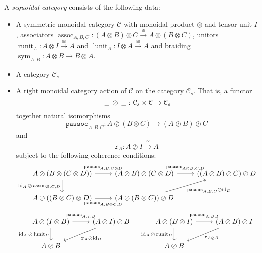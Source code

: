 \documentclass[a4paper,UKenglish]{lipics-v2016}
\theoremstyle{plain}
\theoremstyle{definition}
\newcommand*\from{\colon}
\DeclareMathOperator{\id}{id}
\newcommand{\tensor}{\otimes}
\newcommand{\sequoid}{\oslash}
\newcommand{\C}{\mathcal C}
\DeclareMathOperator{\assoc}{assoc}
\DeclareMathOperator{\lunit}{lunit}
\DeclareMathOperator{\runit}{runit}
\DeclareMathOperator{\sym}{sym}
\newcommand{\blank}{\;\underline{\hspace{1.5ex}}\;}
\newcommand{\toisom}{{\xrightarrow{\cong}}}
\newcommand{\passoc}{{\mathtt{passoc}}}
\newcommand{\run}{{\mathtt{r}}}
\newlength{\arrow}
\begin{document}
\begin{definition}
  A \emph{sequoidal category} consists of the following data:
  \begin{itemize}
    \item A symmetric monoidal category $\C$ with monoidal product $\tensor$ and tensor unit $I$, associators $\assoc_{A,B,C}\from(A\tensor B)\tensor C\toisom A\tensor(B\tensor C)$, unitors $\runit_A\from A\tensor I\toisom A$ and $\lunit_A\from I\tensor A\toisom A$ and braiding $\sym_{A,B}\from A\tensor B\to B\tensor A$.
    \item A category $\C_s$
    \item A right monoidal category action of $\C$ on the category $\C_s$.  That is, a functor
      \[
        \blank\sequoid\blank\from\C_s\times\C\to\C_s
        \]
      together natural isomorphisms
      \[
        \passoc_{A,B,C}\from A\sequoid(B\tensor C)\to (A\sequoid B)\sequoid C
        \]
      and
      \[
        \run_A\from A\sequoid I\toisom A
        \]
      subject to the following coherence conditions:
      \begin{equation*}
        \begin{tikzcd}
          A\sequoid(B\tensor(C\tensor D)) \arrow[r, "\passoc_{A,B,C\tensor D}" yshift=0.3em] \arrow[d, "\id_A\sequoid \assoc_{B,C,D}"']
            & (A \sequoid B) \sequoid (C\tensor D) \arrow[r, "\passoc_{A\sequoid B,C,D}" yshift=0.3em]
              & ((A\sequoid B)\sequoid C) \sequoid D \\
          A\sequoid((B\tensor C)\tensor D) \arrow[r, "\passoc_{A,B\tensor C,D}"' yshift=-0.3em]
            & (A\sequoid (B\tensor C)) \sequoid D \arrow[ur, "\passoc_{A,B,C}\sequoid\id_D"']
              &
        \end{tikzcd}
      \end{equation*}
      \begin{equation*}
        \begin{tikzcd}
          A \sequoid (I\tensor B) \arrow[r, "\passoc_{A,I,B}" yshift=0.3em] \arrow[d, "\id_A\sequoid\lunit_B"']
            & (A\sequoid I)\sequoid B \arrow[dl, "\run_A\sequoid\id_B"] \\
          A \sequoid B
            &
        \end{tikzcd}
        \quad
        \begin{tikzcd}
          A \sequoid (B\tensor I) \arrow[r, "\passoc_{A,B,I}" yshift=0.3em] \arrow[d, "\id_A\sequoid\runit_B"']
            & (A\sequoid B) \sequoid I \arrow[dl, "\run_{A\sequoid B}"] \\
          A\sequoid B
            &
        \end{tikzcd}
      \end{equation*}


\end{itemize}
\end{definition}
\end{document}
